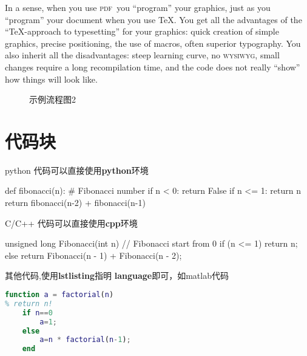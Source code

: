 In a sense, when you use {\scshape pdf}\ you ``program'' your graphics, just
as you ``program'' your document when you use \TeX.  You get all
the advantages of the ``\TeX-approach to typesetting'' for your
graphics: quick creation of simple graphics, precise positioning, the
use of macros, often superior typography. You also inherit all the
disadvantages: steep learning curve, no \textsc{wysiwyg}, small
changes require a long recompilation time, and the code does not
really ``show'' how things will look like.





\begin{figure}
    \centering
    
    \caption{\label{fig:exmaple2} 示例流程图2}
\end{figure}


\section{代码块}
\label{sec:method:code}

python 代码可以直接使用\textbf{python}环境

\begin{python}[caption={斐波那契Python}]
def fibonacci(n):
    # Fibonacci number
    if n < 0:
        return False
    if n <= 1:
        return n
    return fibonacci(n-2) + fibonacci(n-1)
\end{python}

C/C++ 代码可以直接使用\textbf{cpp}环境

\begin{cpp}[caption={斐波那契C++}]
unsigned long Fibonacci(int n)
{
    // Fibonacci start from 0
    if (n <= 1)
    {
        return n;
    }
    else
    {
        return Fibonacci(n - 1) + Fibonacci(n - 2);
    }
}
\end{cpp}

其他代码,使用\textbf{lstlisting}指明 \textbf{language}即可，如matlab代码

\begin{lstlisting}[caption={Matlab代码},language=Matlab]
function a = factorial(n)
% return n!
    if n==0
        a=1;
    else
        a=n * factorial(n-1);
    end
\end{lstlisting} 